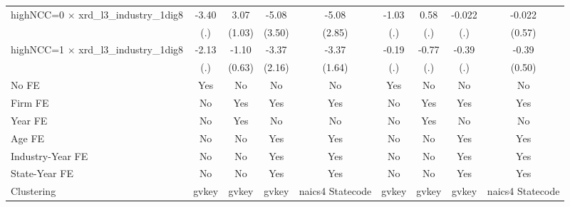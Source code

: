 {\begin{tabular}{l*{8}{c}}
\addlinespace
highNCC=0 $\times$ xrd\_l3\_industry\_1dig8&       -3.40         &        3.07\sym{***}&       -5.08         &       -5.08\sym{*}  &       -1.03         &        0.58         &      -0.022         &      -0.022         \\
                    &         (.)         &      (1.03)         &      (3.50)         &      (2.85)         &         (.)         &         (.)         &         (.)         &      (0.57)         \\
\addlinespace
highNCC=1 $\times$ xrd\_l3\_industry\_1dig8&       -2.13         &       -1.10\sym{*}  &       -3.37         &       -3.37\sym{**} &       -0.19         &       -0.77         &       -0.39         &       -0.39         \\
                    &         (.)         &      (0.63)         &      (2.16)         &      (1.64)         &         (.)         &         (.)         &         (.)         &      (0.50)         \\
\addlinespace
No FE               &         Yes         &          No         &          No         &          No         &         Yes         &          No         &          No         &          No         \\
\addlinespace
Firm FE             &          No         &         Yes         &         Yes         &         Yes         &          No         &         Yes         &         Yes         &         Yes         \\
\addlinespace
Year FE             &          No         &         Yes         &          No         &          No         &          No         &         Yes         &          No         &          No         \\
\addlinespace
Age FE              &          No         &          No         &         Yes         &         Yes         &          No         &          No         &         Yes         &         Yes         \\
\addlinespace
Industry-Year FE    &          No         &          No         &         Yes         &         Yes         &          No         &          No         &         Yes         &         Yes         \\
\addlinespace
State-Year FE       &          No         &          No         &         Yes         &         Yes         &          No         &          No         &         Yes         &         Yes         \\
\midrule
Clustering          &       gvkey         &       gvkey         &       gvkey         &naics4 Statecode         &       gvkey         &       gvkey         &       gvkey         &naics4 Statecode         \\

\end{tabular}}
